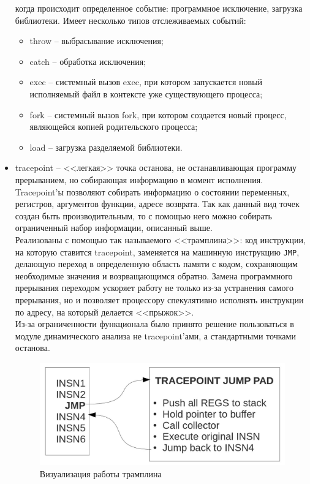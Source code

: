 \begin{itemize}
        когда происходит определенное событие: программное исключение,
        загрузка библиотеки. Имеет несколько типов отслеживаемых событий:
        \begin{itemize}
            \item throw -- выбрасывание исключения;
            \item catch -- обработка исключения;
            \item exec -- системный вызов exec, при котором запускается
                новый исполняемый файл в контексте уже существующего
                процесса;
            \item fork -- системный вызов fork, при котором создается
                новый процесс, являющейся копией родительского процесса;
            \item load -- загрузка разделяемой библиотеки.
        \end{itemize}
    \item tracepoint -- <<легкая>> точка останова, не останавливающая
        программу прерыванием, но собирающая информацию в момент 
        исполнения. Tracepoint'ы позволяют собирать информацию о 
        состоянии переменных, регистров, аргументов функции,
        адресе возврата. Так как данный вид точек создан быть
        производительным, то с помощью него можно собирать ограниченный
        набор информации, описанный выше. \\
        Реализованы с помощью так называемого <<трамплина>>:
        код инструкции, на которую ставится tracepoint, заменяется
        на машинную инструкцию \verb|JMP|, делающую переход в определенную
        область памяти с кодом, сохраняющим необходимые значения и возрващающимся
        обратно. Замена программного прерывания переходом ускоряет работу
        не только из-за устранения самого прерывания, но и позволяет процессору
        спекулятивно исполнять инструкции по адресу, на который делается
        <<прыжок>>. \\
        Из-за ограниченности функционала было принято решение
        пользоваться в модуле динамического анализа {\ProgModule} не
        tracepoint'ами, а стандартными точками останова.
        \begin{figure}[!hbtp]
            \includegraphics[width=\textwidth,height=\textheight,keepaspectratio]{images/jump_table.jpg}
            \caption{Визуализация работы трамплина \label{fig:nim-doc-gen}}
        \end{figure}
\end{itemize}


